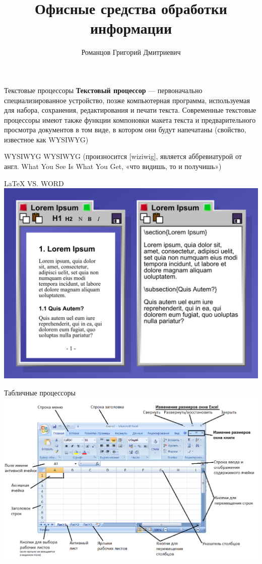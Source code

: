 \documentclass[10pt,pdf,hyperref={unicode}]{beamer}%
\title{Офисные средства обработки информации}
\author{Романцов Григорий Дмитриевич}
\date{}
\begin{document}

\begin{frame}%
  \titlepage
\end{frame}

\begin{frame}{Текстовые процессоры}
  \textbf{Текстовый процессор} --- первоначально специализированное устройство, позже компьютерная программа, используемая для набора, сохранения, редактирования и печати текста. Современные текстовые процессоры имеют также функции компоновки макета текста и предварительного просмотра документов в том виде, в котором они будут напечатаны (свойство, известное как WYSIWYG)
\end{frame}

\begin{frame}{WYSIWYG}
  WYSIWYG (произносится [wiziwig], является аббревиатурой от англ. What You See Is What You Get, «что видишь, то и получишь»)
\end{frame}

\begin{frame}{LaTeX VS. WORD}
  \includegraphics[width=\textwidth]{latex.png}
\end{frame}

\begin{frame}{Табличные процессоры}
  \includegraphics[width=\textwidth]{exel.png}
\end{frame}
\end{document}

